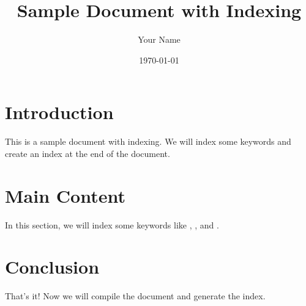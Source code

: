 \documentclass{article}
\begin{document}
\title{Sample Document with Indexing}
\author{Your Name}
\date{\today}
\maketitle

\section{Introduction}

This is a sample document with indexing. We will index some keywords and create an index at the end of the document.

\section{Main Content}

In this section, we will index some keywords like , , and .

\section{Conclusion}

That's it! Now we will compile the document and generate the index.

\printindex %
\end{document}
